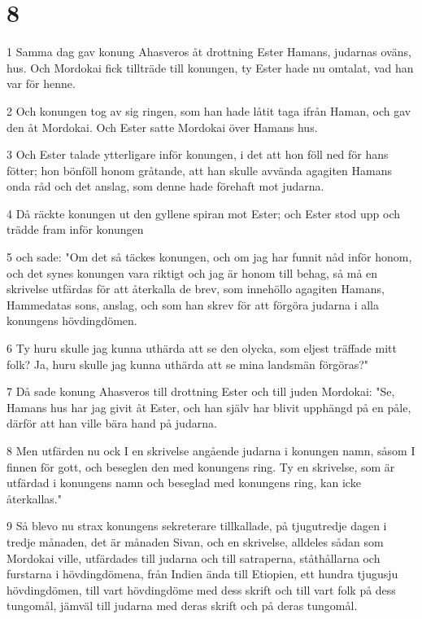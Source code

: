 \chapter{8}

\par 1 Samma dag gav konung Ahasveros åt drottning Ester Hamans, judarnas oväns, hus. Och Mordokai fick tillträde till konungen, ty Ester hade nu omtalat, vad han var för henne.
\par 2 Och konungen tog av sig ringen, som han hade låtit taga ifrån Haman, och gav den åt Mordokai. Och Ester satte Mordokai över Hamans hus.
\par 3 Och Ester talade ytterligare inför konungen, i det att hon föll ned för hans fötter; hon bönföll honom gråtande, att han skulle avvända agagiten Hamans onda råd och det anslag, som denne hade förehaft mot judarna.
\par 4 Då räckte konungen ut den gyllene spiran mot Ester; och Ester stod upp och trädde fram inför konungen
\par 5 och sade: "Om det så täckes konungen, och om jag har funnit nåd inför honom, och det synes konungen vara riktigt och jag är honom till behag, så må en skrivelse utfärdas för att återkalla de brev, som innehöllo agagiten Hamans, Hammedatas sons, anslag, och som han skrev för att förgöra judarna i alla konungens hövdingdömen.
\par 6 Ty huru skulle jag kunna uthärda att se den olycka, som eljest träffade mitt folk? Ja, huru skulle jag kunna uthärda att se mina landsmän förgöras?"
\par 7 Då sade konung Ahasveros till drottning Ester och till juden Mordokai: "Se, Hamans hus har jag givit åt Ester, och han själv har blivit upphängd på en påle, därför att han ville bära hand på judarna.
\par 8 Men utfärden nu ock I en skrivelse angående judarna i konungen namn, såsom I finnen för gott, och beseglen den med konungens ring. Ty en skrivelse, som är utfärdad i konungens namn och beseglad med konungens ring, kan icke återkallas."
\par 9 Så blevo nu strax konungens sekreterare tillkallade, på tjugutredje dagen i tredje månaden, det är månaden Sivan, och en skrivelse, alldeles sådan som Mordokai ville, utfärdades till judarna och till satraperna, ståthållarna och furstarna i hövdingdömena, från Indien ända till Etiopien, ett hundra tjugusju hövdingdömen, till vart hövdingdöme med dess skrift och till vart folk på dess tungomål, jämväl till judarna med deras skrift och på deras tungomål.

